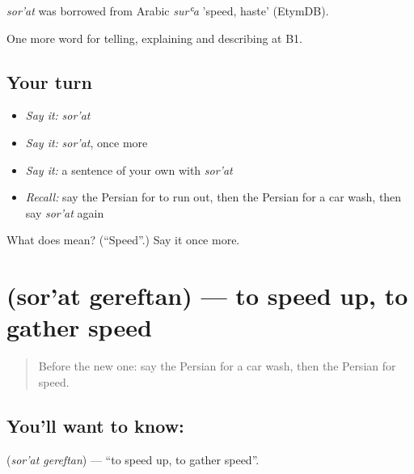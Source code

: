 \begin{cousinweb}
\emph{sor'at} was borrowed from Arabic \emph{surʿa} 'speed, haste' (EtymDB).
\end{cousinweb}

\begin{grammarlens}[title={What you've built}]
One more word for telling, explaining and describing at B1.
\end{grammarlens}

\subsection*{Your turn}
\begin{itemize}
\raggedright
  \item \emph{Say it:} \emph{sor'at}
  \item \emph{Say it:} \emph{sor'at}, once more
  \item \emph{Say it:} a sentence of your own with \emph{sor'at}
  \item \emph{Recall:} say the Persian for to run out, then the Persian for a car wash, then say \emph{sor'at} again
\end{itemize}

\begin{tcolorbox}[breakable,colback=teal!4,colframe=teal!35!black,title={Before you move on}]
What does  mean? (\textquotedblleft{}Speed\textquotedblright{}.) Say it once more.
\end{tcolorbox}
\section[\texorpdfstring{\fa{سرعت} \fa{گرفتن} (sor'at gereftan)}{سرعت گرفتن (sor'at gereftan)}]{  (sor'at gereftan) — to speed up, to gather speed}

\label{lesson:FA-C424-sorat-gereftan}



\begin{quote}
Before the new one: say the Persian for a car wash, then the Persian for speed.
\end{quote}

\subsection*{You'll want to know:  }
\textbf{ } (\emph{sor'at gereftan}) — \textquotedblleft{}to speed up, to gather speed\textquotedblright{}.

